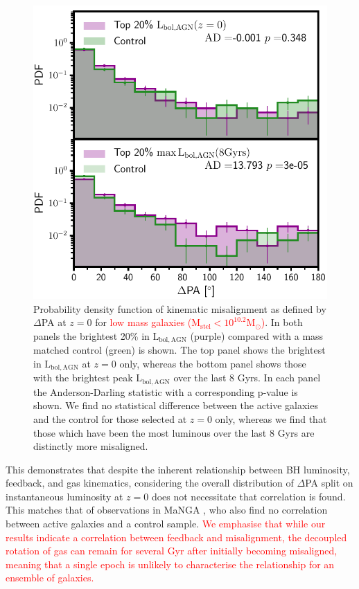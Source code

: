 \documentclass[fleqn,usenatbib]{mnras}
\newcommand{\red}[1]{{\textcolor{red}{#1}}}
\begin{document}
\begin{figure}
    \centering
	\includegraphics[width=\linewidth]{overall_population/PA_distribution_low_mass_z0_max_comparison.pdf}
    \caption{Probability density function of kinematic misalignment as defined by $\Delta$PA at $z=0$ for \red{low mass galaxies ($\mathrm{M_{stel} < 10^{10.2}M_{\odot}}$)}. In both panels the brightest 20\% in $\mathrm{L_{bol,AGN}}$ (purple) compared with a mass matched control (green) is shown. The top panel shows the brightest in $\mathrm{L_{bol,AGN}}$ at $z=0$ only, whereas the bottom panel shows those with the brightest peak $\mathrm{L_{bol, AGN}}$ over the last 8 Gyrs. In each panel the Anderson-Darling statistic with a corresponding p-value is shown. We find no statistical difference between the active galaxies and the control for those selected at $z=0$ only, whereas we find that those which have been the most luminous over the last 8 Gyrs are distinctly more misaligned.}
    \label{fig:PAdist}
\end{figure}

This demonstrates that despite the inherent relationship between BH luminosity, feedback, and gas kinematics, considering the overall distribution of $\Delta$PA split on instantaneous luminosity at $z=0$ does not necessitate that correlation is found. This matches that of observations in MaNGA \citep[Figure 6 in][]{ilha2019}, who also find no correlation between active galaxies and a control sample. \red{We emphasise that while our results indicate a correlation between feedback and misalignment, the decoupled rotation of gas can remain for several Gyr after initially becoming misaligned, meaning that a single epoch is unlikely to characterise the relationship for an ensemble of galaxies.}
\end{document}
